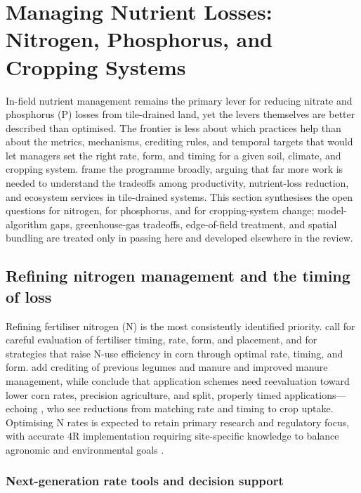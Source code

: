 \documentclass[11pt]{article}
\begin{document}
\section*{Managing Nutrient Losses: Nitrogen, Phosphorus, and Cropping Systems}

In-field nutrient management remains the primary lever for reducing nitrate
and phosphorus (P) losses from tile-drained land, yet the levers themselves are
better described than optimised. The frontier is less about which practices
help than about the metrics, mechanisms, crediting rules, and temporal targets
that would let managers set the right rate, form, and timing for a given soil,
climate, and cropping system. \textcite{Ma2025} frame the programme broadly,
arguing that far more work is needed to understand the tradeoffs among
productivity, nutrient-loss reduction, and ecosystem services in tile-drained
systems. This section synthesises the open questions for nitrogen, for
phosphorus, and for cropping-system change; model-algorithm gaps,
greenhouse-gas tradeoffs, edge-of-field treatment, and spatial bundling are
treated only in passing here and developed elsewhere in the review.

\subsection{Refining nitrogen management and the timing of loss}

Refining fertiliser nitrogen (N) is the most consistently identified priority.
\textcite{ROSSI1991} call for careful evaluation of fertiliser timing, rate,
form, and placement, and \textcite{Zhao2000} for strategies that raise N-use
efficiency in corn through optimal rate, timing, and form. \textcite{Randall2001}
add crediting of previous legumes and manure and improved manure management,
while \textcite{Dattamudi2020} conclude that application schemes need
reevaluation toward lower corn rates, precision agriculture, and split, properly
timed applications---echoing \textcite{Elmi2002}, who see reductions from
matching rate and timing to crop uptake. Optimising N rates is expected to
retain primary research and regulatory focus, with accurate 4R implementation
requiring site-specific knowledge to balance agronomic and environmental goals
\parencite{Christianson2015b}.

\subsubsection{Next-generation rate tools and decision support}
\end{document}
